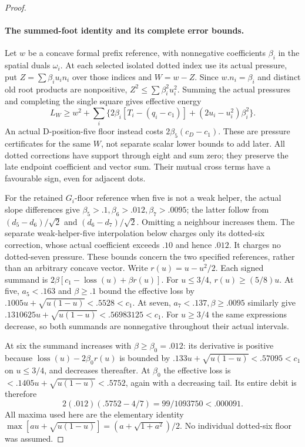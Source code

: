 \documentclass[11pt]{article}
\theoremstyle{definition}
\theoremstyle{remark}
\begin{document}
\begin{proof}
\paragraph{The summed-foot identity and its complete error bounds.}
Let $w$ be a concave formal prefix reference, with nonnegative
coefficients $\beta_i$ in the spatial duals $\omega_i$.
At each selected isolated dotted index use its actual pressure,
put $Z=\sum\beta_i u_i n_i$ over those indices and $W=w-Z$.
Since $w.n_i=\beta_i$ and distinct old root products are
nonpositive, $Z^2\le\sum\beta_i^2u_i^2$. Summing the actual
pressures and completing the single square gives effective energy
\[
 L_W\ge w^2+\sum_i
 \{2\beta_i[T_i-(q_i-c_1)]+(2u_i-u_i^2)\beta_i^2\}.
\]
An actual D-position-five floor instead costs
$2\beta_5(c_D-c_1)$. These are pressure certificates for the
same $W$, not separate scalar lower bounds to add later.
All dotted corrections have support through eight and sum zero;
they preserve the late endpoint coefficient and vector sum. Their
mutual cross terms have a favourable sign, even for adjacent dots.

For the retained $G_i$-floor reference when five is not a weak
helper, the actual slope differences give
$\beta_5>.1,\beta_6>.012,\beta_7>.0095$;
the latter follow from $(d_5-d_6)/\sqrt2$ and
$(d_6-d_7)/\sqrt2$. Omitting a neighbour increases them.
The separate weak-helper-five interpolation below charges only its
dotted-six correction, whose actual coefficient exceeds $.10$ and
hence $.012$. It charges no dotted-seven pressure. These bounds
concern the two specified references, rather than an arbitrary
concave vector.
Write $r(u)=u-u^2/2$. Each signed summand is
$2\beta[c_1-\operatorname{loss}(u)+\beta r(u)]$.
For $u\le3/4$, $r(u)\ge(5/8)u$. At five, $a_5<.163$ and
$\beta\ge.1$ bound the effective loss by
$.1005u+\sqrt{u(1-u)}<.5528<c_1$.
At seven, $a_7<.137,\beta\ge.0095$ similarly give
$.1310625u+\sqrt{u(1-u)}<.56983125<c_1$.
For $u\ge3/4$ the same expressions decrease, so both summands
are nonnegative throughout their actual intervals.

At six the summand increases with $\beta\ge\beta_0=.012$:
its derivative is positive because
$\operatorname{loss}(u)-2\beta_0r(u)$ is bounded by
$.133u+\sqrt{u(1-u)}<.57095<c_1$ on $u\le3/4$,
and decreases thereafter. At $\beta_0$ the effective loss is
$<.1405u+\sqrt{u(1-u)}<.5752$, again with a decreasing tail.
Its entire debit is therefore
\[
 2(.012)(.5752-4/7)=99/1093750<.000091.
\]
All maxima used here are the elementary identity
$\max[au+\sqrt{u(1-u)}]=(a+\sqrt{1+a^2})/2$.
No individual dotted-six floor was assumed.


\end{proof}
\end{document}
